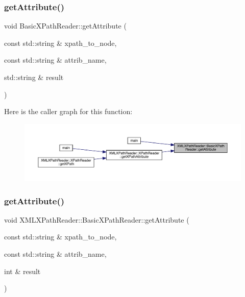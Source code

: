 \mbox{\label{classXMLXPathReader_1_1BasicXPathReader_ab35c63e2c1b2dad0485f9272f3d03ed6}} 
\subsubsection{\texorpdfstring{getAttribute()}{getAttribute()}\hspace{0.1cm}{\footnotesize\ttfamily [2/20]}}
{\footnotesize\ttfamily void Basic\+X\+Path\+Reader\+::get\+Attribute (\begin{DoxyParamCaption}\item[{const std\+::string \&}]{xpath\+\_\+to\+\_\+node,  }\item[{const std\+::string \&}]{attrib\+\_\+name,  }\item[{std\+::string \&}]{result }\end{DoxyParamCaption})}

Here is the caller graph for this function\+:
\nopagebreak
\begin{figure}[H]
\begin{center}
\leavevmode
\includegraphics[width=350pt]{d6/dbf/classXMLXPathReader_1_1BasicXPathReader_ab35c63e2c1b2dad0485f9272f3d03ed6_icgraph}
\end{center}
\end{figure}
\mbox{\label{classXMLXPathReader_1_1BasicXPathReader_a67a27824521cbe011f99c2cafff83239}} 
\subsubsection{\texorpdfstring{getAttribute()}{getAttribute()}\hspace{0.1cm}{\footnotesize\ttfamily [3/20]}}
{\footnotesize\ttfamily void X\+M\+L\+X\+Path\+Reader\+::\+Basic\+X\+Path\+Reader\+::get\+Attribute (\begin{DoxyParamCaption}\item[{const std\+::string \&}]{xpath\+\_\+to\+\_\+node,  }\item[{const std\+::string \&}]{attrib\+\_\+name,  }\item[{int \&}]{result }\end{DoxyParamCaption})}

